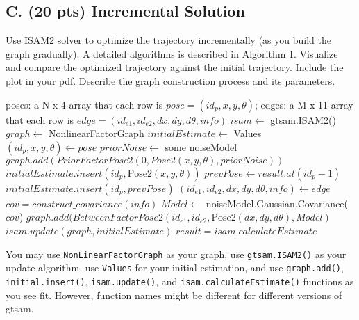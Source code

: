 \documentclass[tp]{lcc}
\begin{document}
\subsection{C. (20 pts) Incremental Solution}
Use ISAM2 solver to optimize the trajectory incrementally (as you build the graph gradually). A detailed algorithms is described in Algorithm 1. Visualize and compare the optimized trajectory against the initial trajectory. Include the plot in your pdf. Describe the graph construction process and its parameters.

\begin{algorithmic}[1]
\Require poses: a N x 4 array that each row is $pose=(id_{p},x,y,\theta)$; edges: a M x 11 array that each row is $edge=(id_{e1},id_{e2},dx,dy,d\theta,info)$
\State $isam \leftarrow$ gtsam.ISAM2() 
    \State $graph \leftarrow$ NonlinearFactorGraph 
    \State $initialEstimate \leftarrow$ Values 
    \State $(id_{p},x,y,\theta) \gets pose$ 
        \State $priorNoise \leftarrow$ some noiseModel 
        \State $graph.add(PriorFactorPose2(0,Pose2(x,y,\theta),priorNoise))$
        \State $initialEstimate.insert(id_{p},\text{Pose2}(x,y,\theta))$
    \Else {}
        \State $prevPose \gets result.at(id_{p}-1)$ 
        \State $initialEstimate.insert(id_{p},prevPose)$
    \EndIf
        \State $(id_{e1},id_{e2},dx,dy,d\theta,info) \gets edge$ 
            \State $cov=construct\_covariance(info)$ 
            \State $Model \leftarrow$ noiseModel.Gaussian.Covariance($cov$)
            \State $graph.add(BetweenFactorPose2(id_{e1},id_{e2},\text{Pose2}(dx,dy,d\theta),Model)$
        \EndIf
    \EndFor
    \State $isam.update(graph,initialEstimate)$
    \State $result=isam.calculateEstimate$
\EndFor
\end{algorithmic}

You may use \texttt{NonLinearFactorGraph} as your graph, use \texttt{gtsam.ISAM2()} as your update algorithm, use \texttt{Values} for your initial estimation, and use \texttt{graph.add()}, \texttt{initial.insert()}, \texttt{isam.update()}, and \texttt{isam.calculateEstimate()} functions as you see fit. However, function names might be different for different versions of gtsam.
\end{document}
